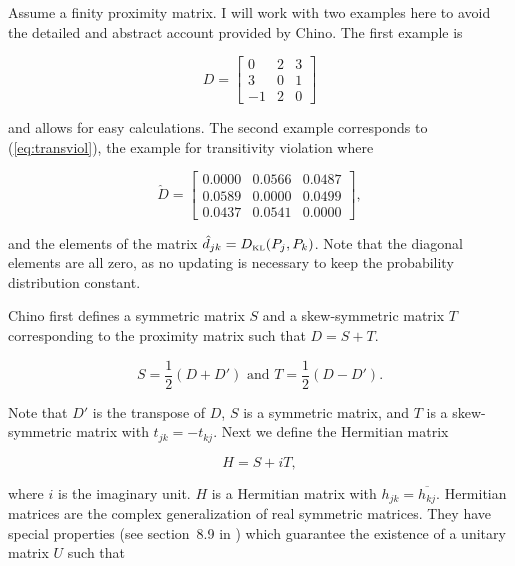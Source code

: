\documentclass[phd,12pt,oneside]{ubcthesis}
\begin{document}
Assume a finity proximity matrix. I will work with two examples here
to avoid the detailed and abstract account provided by Chino. The
first example is

\begin{equation}
  \label{eq:simpromat}
D=\left[
      \begin{array}{ccc}
        0 & 2 & 3 \\
        3 & 0 & 1 \\
        -1 & 2 & 0 
      \end{array}
\right]
\end{equation}

{\noindent}and allows for easy calculations. The second example corresponds to
(\ref{eq:transviol}), the example for transitivity violation where

\begin{equation}
  \label{eq:dklpromat}
\hat{D}=\left[
      \begin{array}{ccc}
0.0000 &  0.0566 &  0.0487 \\
0.0589 &  0.0000 &  0.0499 \\
0.0437 &  0.0541 &  0.0000
      \end{array}
\right],
\end{equation}

{\noindent}and the elements of the matrix $\hat{d}_{jk}=D_{\mbox{\tiny KL}}(P_{j},P_{k})$.
Note that the diagonal elements are all zero, as no updating is
necessary to keep the probability distribution constant.

Chino first defines a symmetric matrix $S$ and a skew-symmetric matrix
$T$ corresponding to the proximity matrix such that $D=S+T$.

\begin{equation}
  \label{eq:skewsym}
  S=\frac{1}{2}(D+D')\mbox{ and }T=\frac{1}{2}(D-D').
\end{equation}

{\noindent}Note that $D'$ is the transpose of $D$, $S$ is a symmetric matrix, and
$T$ is a skew-symmetric matrix with $t_{jk}=-t_{kj}$. Next we define
the Hermitian matrix

\begin{equation}
  \label{eq:herm}
  H=S+iT,
\end{equation}

{\noindent}where $i$ is the imaginary unit. $H$ is a Hermitian matrix with
$h_{jk}=\overline{h_{kj}}$. Hermitian matrices are the complex
generalization of real symmetric matrices. They have special
properties (see section~8.9 in ) which
guarantee the existence of a unitary matrix $U$ such that
\end{document}
